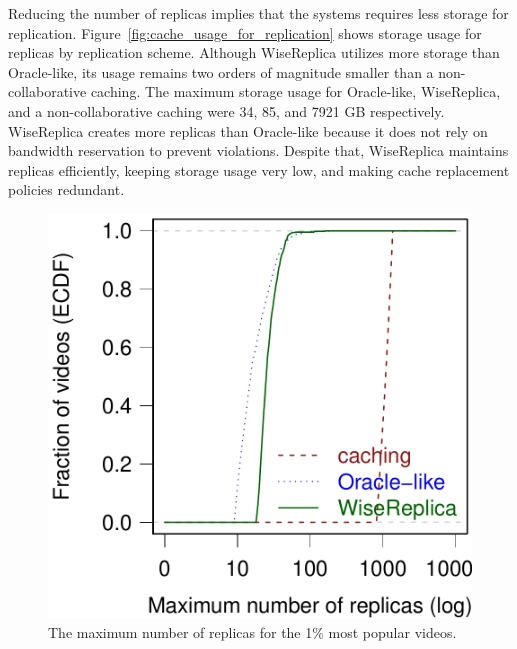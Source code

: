 Reducing the number of replicas implies that the systems requires less storage for replication. Figure~\ref{fig:cache_usage_for_replication} shows storage usage for replicas by replication scheme. Although WiseReplica utilizes more storage than Oracle-like, its usage remains two orders of magnitude smaller than a non-collaborative caching. The maximum storage usage for Oracle-like, WiseReplica, and a non-collaborative caching were 34, 85, and 7921 GB respectively. WiseReplica creates more replicas than Oracle-like because it does not rely on bandwidth reservation to prevent violations. Despite that, WiseReplica maintains replicas efficiently, keeping storage usage very low, and making cache replacement policies redundant.

\begin{figure}[htbp]
	\begin{minipage}[t]{0.48\linewidth}
		\includegraphics[width=.95\textwidth]{inputs/img/ecdf_replicas}
		\caption{The maximum number of replicas for the 1\% most popular videos.}
		\label{fig:replication_for_most_popular}
	\end{minipage}
	\hspace{0.1cm}
	\begin{minipage}[t]{0.48\linewidth}

\end{minipage}
\end{figure}
